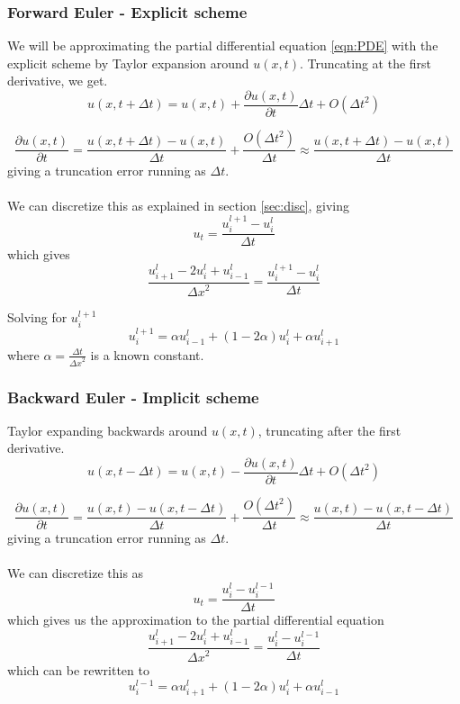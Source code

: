 \documentclass[10pt,a4paper]{article}
\newcommand{\dt}{{\Delta t}}
\newcommand{\dx}{{\Delta x}}
\newcommand{\pt}{{\partial t}}
\newcommand{\pu}{{\partial u}}
\begin{document}
\subsubsection{Forward Euler - Explicit scheme}
We will be approximating the partial differential equation \ref{eqn:PDE} with the explicit scheme by Taylor expansion around $u(x,t)$. Truncating at the first derivative, we get.
\begin{equation}
u(x,t+\dt) = u(x,t) + \frac{\pu(x,t)}{\pt}\dt + O(\dt^2)
\end{equation}

\begin{equation}
\frac{\pu(x,t)}{\pt} = \frac{u(x,t+\dt) - u(x,t)}{\dt} + \frac{O(\dt^2)}{\dt} \approx \frac{u(x,t+\dt) - u(x,t)}{\dt}
\end{equation}
giving a truncation error running as $\dt$.
\\\\
We can discretize this as explained in section \ref{sec:disc}, giving
\begin{equation}
u_t = \frac{u_i^{l+1} - u_i^l}{\dt}
\end{equation}
which gives
\begin{equation}
\frac{u_{i+1}^l - 2u_i^l+u_{i-1}^l}{\dx^2} = \frac{u_i^{l+1} - u_i^l}{\dt}
\end{equation}

Solving for $u_i^{l+1}$
\begin{equation}
u_i^{l+1} = \alpha u_{i-1}^l + (1-2\alpha)u_i^l + \alpha u_{i+1}^l
\end{equation}
where $\alpha = \frac{\dt}{\dx^2}$ is a known constant.


\subsubsection{Backward Euler - Implicit scheme}
Taylor expanding backwards around $u(x,t)$, truncating after the first derivative.
\begin{equation}
u(x,t-\dt) = u(x,t) - \frac{\pu(x,t)}{\pt}\dt + O(\dt^2)
\end{equation}

\begin{equation}
\frac{\pu(x,t)}{\pt} = \frac{u(x,t) - u(x,t-\dt)}{\dt} + \frac{O(\dt^2)}{\dt} \approx \frac{u(x,t) - u(x,t-\dt)}{\dt}
\end{equation}
giving a truncation error running as $\dt$.
\\\\
We can discretize this as
\begin{equation}
u_t = \frac{u_i^l - u_i^{l-1}}{\dt}
\end{equation}
which gives us the approximation to the partial differential equation
\begin{equation}
\frac{u_{i+1}^l - 2u_i^l+u_{i-1}^l}{\dx^2} = \frac{u_i^l - u_i^{l-1}}{\dt}
\end{equation}
which can be rewritten to
\begin{equation}\label{eqn:implicit}
u_i^{l-1} = \alpha u_{i+1}^l + (1 - 2\alpha )u_i^l + \alpha u_{i-1}^l
\end{equation}
\end{document}
